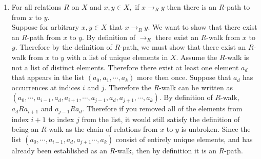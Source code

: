 \documentclass[12pt, letterpaper]{article}
\begin{document}
	\begin{enumerate}
		\item For all relations $R$ on $X$ and $x,y \in X,$ if $x \longrightarrow_R y$ then there is an $R$-path to from $x$ to $y$. \\ 
			Suppose for arbitrary $x,y \in X$ that $x \longrightarrow_R y.$  We want to show that there exist an $R$-path from $x$ to $y$.  
			By definition of $\longrightarrow_R$ there exist an $R$-walk from $x$ to $y$.  Therefore by the definition of $R$-path, we must show that there exist an $R$-walk from $x$ to $y$ with a list of unique elements in $X$.  Assume the $R$-walk is not a list of distinct elements.  Therefore there exist at least one element $a_d$ that appears in the list $(a_0,a_1,\cdots, a_k)$ more then once.  Suppose that $a_d$ has occurrences at indices $i$ and $j$.  Therefore the $R$-walk can be written as $(a_0,\cdots,a_{i-1},a_d,a_{i+1},\cdots,a_{j-1},a_d,a_{j+1},\cdots, a_k)$.  By definition of $R$-walk, $a_d R a_{i+1}$ and $a_{j-1}Ra_d$.  Therefore if you removed all of the elements from index $i+1$ to index $j$ from the list, it would still satisfy the definition of being an $R$-walk as the chain of relations from $x$ to $y$ is unbroken.  Since the list $(a_0,\cdots,a_{i-1},a_d,a_{j+1}\cdots, a_k)$ consist of entirely unique elements, and has already been established as an $R$-walk, then by definition it is an $R$-path.             		
		

\end{enumerate}
\end{document}
